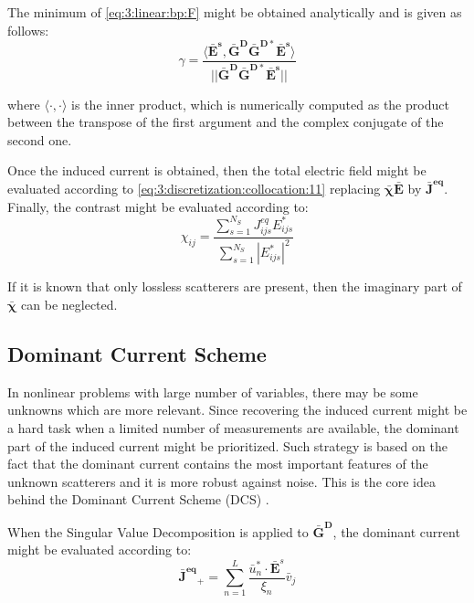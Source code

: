 			The minimum of \eqref{eq:3:linear:bp:F} might be obtained analytically and is given as follows:
			\begin{equation}
				\gamma = \frac{\langle \mathbf{\bar{E}^s}, \mathbf{\bar{G}^D}\mathbf{\bar{G}^{D*}}\mathbf{\bar{E}^s}\rangle}{||\mathbf{\bar{G}^D}\mathbf{\bar{G}^{D*}}\mathbf{\bar{E}^s}||}
			\end{equation}

			\noindent where $\langle\cdot,\cdot\rangle$ is the inner product, which is numerically computed as the product between the transpose of the first argument and the complex conjugate of the second one.
			
			Once the induced current is obtained, then the total electric field might be evaluated according to \eqref{eq:3:discretization:collocation:11} replacing $\boldsymbol{\bar{\chi}}\mathbf{\bar{E}}$ by $\mathbf{\bar{J}^{eq}}$. Finally, the contrast might be evaluated according to:
			\begin{equation}
				\chi_{ij} = \frac{\sum\limits_{s=1}^{N_S}J^{eq}_{ijs}E^*_{ijs}}{\sum\limits_{s=1}^{N_S}|E^*_{ijs}|^2} \label{eq:3:linear:bp:x}
			\end{equation}
		
			If it is known that only lossless scatterers are present, then the imaginary part of $\boldsymbol{\bar{\chi}}$ can be neglected.
			
		\subsection{Dominant Current Scheme}\label{chap:methods:linear:dominantcurrent}
			
			In nonlinear problems with large number of variables, there may be some unknowns which are more relevant. Since recovering the induced current might be a hard task when a limited number of measurements are available, the dominant part of the induced current might be prioritized. Such strategy is based on the fact that the dominant current contains the most important features of the unknown scatterers and it is more robust against noise. This is the core idea behind the Dominant Current Scheme (DCS) \citep{wei2019deep}.
			
			When the Singular Value Decomposition is applied to $\mathbf{\bar{G}^D}$, the dominant current might be evaluated according to:
			\begin{equation}
				\mathbf{\bar{J}^{eq}}_+ = \sum\limits_{n=1}^L \frac{\bar{u}^*_n\cdot \mathbf{\bar{E}}^s}{\xi_n}\bar{v}_j \label{eq:3:linear:dcs:j+}
			\end{equation}
		
